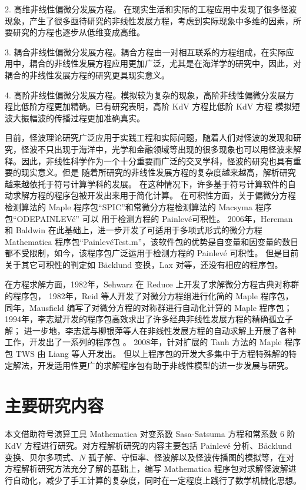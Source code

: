 2. 高维非线性偏微分发展方程。 在现实生活和实际的工程应用中发现了很多怪波现象，产生了很多亟待研究的非线性发展方程，考虑到实际现象中多维的因素，所要研究的方程也逐步从低维变成高维。

3. 耦合非线性偏微分发展方程。耦合方程由一对相互联系的方程组成，在实际应用中，耦合的非线性发展方程应用更加广泛，尤其是在海洋学的研究中，因此，对耦合的非线性发展方程的研究更具现实意义。

4. 高阶非线性偏微分发展方程。模拟较为复杂的现象，高阶非线性偏微分发展方程比低阶方程更加精确。已有研究表明，高阶 KdV 方程比低阶 KdV 方程 模拟短波大振幅波的传播过程更加准确真实。

目前，怪波理论研究广泛应用于实践工程和实际问题，随着人们对怪波的发现和研究，怪波不只出现于海洋中，光学和金融领域等出现的很多现象也可以用怪波来解释。因此，非线性科学作为一个十分重要而广泛的交叉学科，怪波的研究也具有重要的现实意义。但是
随着所研究的非线性发展方程的复杂度越来越高，解析研究越来越依托于符号计算学科的发展。
在这种情况下，许多基于符号计算软件的自动求解方程的程序包被开发出来用于简化计算。
在可积性方面，关于偏微分方程检测算法的 Maple 程序包“SPIC”和常微分方程检测算法的 Macsyma 程序包“ODEPAINLEV\'{e}” 可以
用于检测方程的 Painlev\'{e}可积性。
2006年，Hereman 和 Baldwin 在此基础上，进一步开发了可适用于多项式形式的微分方程 Mathematica 程序包“Painlev\'{e}Test.m”，该软件包的优势是自变量和因变量的数目都不受限制，如今，该程序包广泛运用于检测方程的
Painlev\'{e} 可积性。
但是目前关于其它可积性的判定如 B\"{a}cklund 变换，Lax 对等，还没有相应的程序包。

在方程求解方面，1982年，Sehwarz 在 Reduce 上开发了求解微分方程古典对称群的程序包，
1982年，Reid 等人开发了对微分方程组进行化简的 Maple 程序包，同年，Mausfield 编写了对微分方程的对称群进行自动化计算的 Maple 程序包；
1994年，李志斌开发的程序包高效求出了许多经典非线性发展方程的精确孤立子解；
进一步地，李志斌与柳银萍等人在非线性发展方程的自动求解上开展了各种工作，开发出了一系列的程序包
。
2008年，针对扩展的 Tanh 方法的 Maple 程序包 TWS 由 Liang 等人开发出。
但以上程序包的开发大多集中于方程特殊解的特定解法，开发适用性更广的求解程序包有助于非线性模型的进一步发展与研究。
\section{主要研究内容}
本文借助符号演算工具 Mathematica 对变系数 Sasa-Satsuma 方程和常系数 6 阶 KdV 方程进行研究。对方程解析研究的内容主要包括 Painlev\'{e} 分析、B\"{a}cklund 变换、贝尔多项式、$N$ 孤子解、守恒率、怪波解以及怪波传播图的模拟等，在对方程解析研究方法充分了解的基础上，编写 Mathematica 程序包对求解怪波解进行自动化，减少了手工计算的复杂度，同时在一定程度上践行了数学机械化思想。

